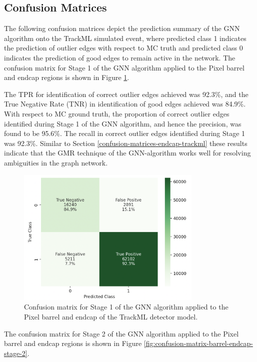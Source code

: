 \subsection{Confusion Matrices}

The following confusion matrices depict the prediction summary of the GNN algorithm onto the TrackML simulated event, where predicted class 1 indicates the prediction of outlier edges with respect to MC truth and predicted class 0 indicates the prediction of good edges to remain active in the network. The confusion matrix for Stage 1 of the GNN algorithm applied to the Pixel barrel and endcap regions is shown in Figure \ref{fig:confusion-matrix-barrel-endcap-stage-1}.


The TPR for identification of correct outlier edges achieved was 92.3\%, and the True Negative Rate (TNR) in identification of good edges achieved was 84.9\%. With respect to MC ground truth, the proportion of correct outlier edges identified during Stage 1 of the GNN algorithm, and hence the precision, was found to be 95.6\%. The recall in correct outlier edges identified during Stage 1 was 92.3\%. Similar to Section \ref{confusion-matrices-endcap-trackml} these results indicate that the GMR technique of the GNN-algorithm works well for resolving ambiguities in the graph network.

\begin{figure}[htbp]
    \centering
    \includegraphics[width=0.79\textwidth]{images/7-results/confusion_matrix_barrel_stage_1.png}
    \caption{Confusion matrix for Stage 1 of the GNN algorithm applied to the Pixel barrel and endcap of the TrackML detector model.}
    \label{fig:confusion-matrix-barrel-endcap-stage-1}%
\end{figure}

The confusion matrix for Stage 2 of the GNN algorithm applied to the Pixel barrel and endcap regions is shown in Figure \ref{fig:confusion-matrix-barrel-endcap-stage-2}.


